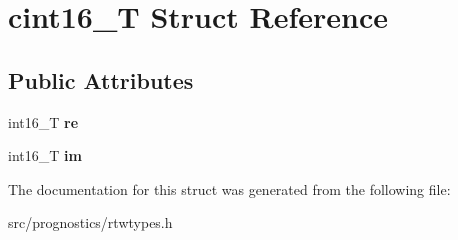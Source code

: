 \hypertarget{structcint16__T}{}\section{cint16\+\_\+T Struct Reference}
\label{structcint16__T}
\subsection*{Public Attributes}
\begin{DoxyCompactItemize}
\item 
\mbox{\label{structcint16__T_af25522e372c99b713658503c859eaa02}} 
int16\+\_\+T {\bfseries re}
\item 
\mbox{\label{structcint16__T_a164d778a27b1e18f8551c0d0aa83a7fc}} 
int16\+\_\+T {\bfseries im}
\end{DoxyCompactItemize}


The documentation for this struct was generated from the following file\+:\begin{DoxyCompactItemize}
\item 
src/prognostics/rtwtypes.\+h\end{DoxyCompactItemize}
